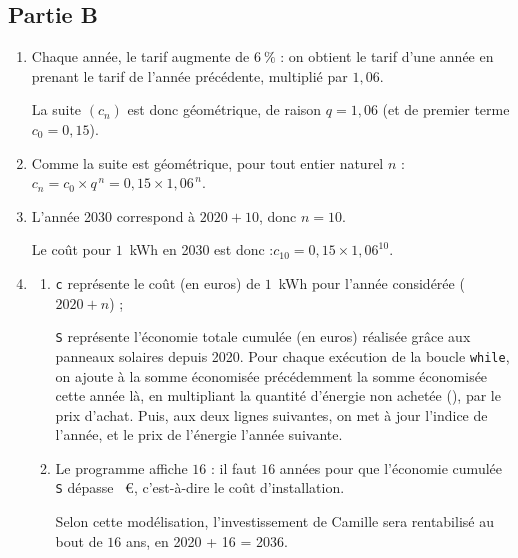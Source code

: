 	\subsection*{Partie B}

	\begin{enumerate}
		\item Chaque année, le tarif augmente de $6~\%$ : on obtient le tarif d'une année en prenant le tarif de l'année précédente, multiplié par $1,06$.

		La suite $\left(c_{n}\right)$ est donc géométrique, de raison $q=1,06$ (et de premier terme $c_{0}=0,15$).

		\item Comme la suite est géométrique, pour tout entier naturel $n$ : \quad $c_{n}=c_{0}\times q^{\,n}=0,15\times 1,06^{\,n}$.

		\item L'année 2030 correspond à $2020 + 10$, donc $n=10$.

		Le coût pour $1$~kWh en 2030 est donc :\quad $c_{10}=0,15\times 1,06^{10}$.

		\item \begin{enumerate}
			\item \texttt{c} représente le coût (en euros) de $1$~kWh pour l'année considérée ($2020+n$) ;

			\texttt{S} représente l'économie totale cumulée (en euros) réalisée grâce aux panneaux solaires depuis 2020. Pour chaque exécution de la boucle \texttt{while}, on ajoute à la somme économisée précédemment la somme économisée cette année là, en multipliant la quantité d'énergie non achetée (), par le prix d'achat. Puis, aux deux lignes suivantes, on met à jour l'indice de l'année, et le prix de l'énergie l'année suivante.

			\item Le programme affiche $16$ : il faut $16$ années pour que l'économie cumulée \texttt{S} dépasse ~\euro{}, c'est-à-dire le coût d'installation.

			Selon cette modélisation, l'investissement de Camille sera rentabilisé au bout de $16$ ans, en 2020 + 16 = 2036.
		\end{enumerate}
	\end{enumerate}
